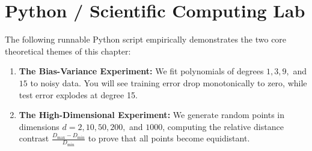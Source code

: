 \section{Python / Scientific Computing Lab}

The following runnable Python script empirically demonstrates the two core theoretical themes of this chapter:
\begin{enumerate}
    \item \textbf{The Bias-Variance Experiment:} We fit polynomials of degrees $1, 3, 9,$ and $15$ to noisy data. You will see training error drop monotonically to zero, while test error explodes at degree 15.
    \item \textbf{The High-Dimensional Experiment:} We generate random points in dimensions $d = 2, 10, 50, 200,$ and $1000$, computing the relative distance contrast $\frac{D_{\max} - D_{\min}}{D_{\min}}$ to prove that all points become equidistant.
\end{enumerate}

